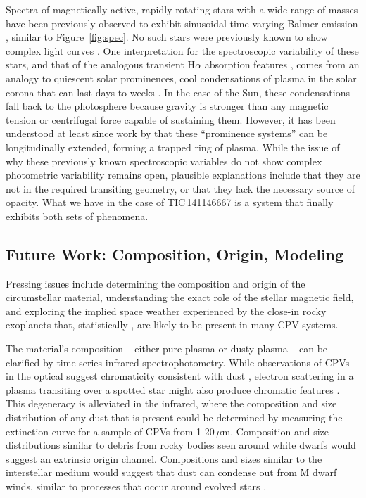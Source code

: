 \documentclass[11pt,twocolumn,tighten]{aastex7}
\begin{document}
Spectra of magnetically-active, rapidly rotating stars with a wide
range of masses have been previously observed to exhibit sinusoidal
time-varying Balmer emission
\citep{Donati2000,Townsend2005b,Dunstone2006,Skelly2008}, similar to
Figure~\ref{fig:spec}.  No such stars were previously known to show
complex light curves \citep{Bouma2024}.   One interpretation for the
spectroscopic variability of these stars, and that of the analogous
transient H$\alpha$ absorption features
\citep{CollierCameron1989,CollierCameron1992,Cang2020}, comes from an
analogy to quiescent solar prominences, cool condensations of plasma
in the solar corona that can last days to weeks
\citep{VialEngvold2015}.  In the case of the Sun, these condensations
fall back to the photosphere because gravity is stronger than any
magnetic tension or centrifugal force capable of sustaining them.
However, it has been understood at least since work by
\citet{Donati2000} that these ``prominence systems'' can be
longitudinally extended, forming a trapped ring of plasma.  While the
issue of why these previously known spectroscopic variables do not
show complex photometric variability remains open, plausible
explanations include that they are not in the required transiting
geometry, or that they lack the necessary source of opacity.  What we
have in the case of TIC\,141146667 is a system that finally exhibits
both sets of phenomena.


\subsection{Future Work: Composition, Origin, Modeling}

Pressing issues include determining the composition and origin of the
circumstellar material, understanding the exact role of the stellar
magnetic field, and exploring the implied space weather experienced by
the close-in rocky exoplanets that, statistically \citep{Dressing2015},
are likely to be present in many CPV systems.

The material's composition -- either pure plasma or dusty plasma --
can be clarified by time-series infrared spectrophotometry.  While
observations of CPVs in the optical suggest chromaticity consistent
with dust \citep{Tanimoto2020,Gunther2022,Koen2023}, electron
scattering in a plasma transiting over a spotted star might
also produce chromatic features \citep{Rackham2018}.  This
degeneracy is alleviated in the infrared, where the composition and
size distribution of any dust that is present could be determined by
measuring the extinction curve for a sample of CPVs from 1-20\,$\mu$m.
Composition and size distributions similar to debris from rocky bodies
seen around white dwarfs \citep{Reach2009} would suggest an extrinsic
origin channel.  Compositions and sizes similar to the interstellar
medium would suggest that dust can condense out from M dwarf winds,
similar to processes that occur around evolved stars
\citep{Marigo2008}.
\end{document}
